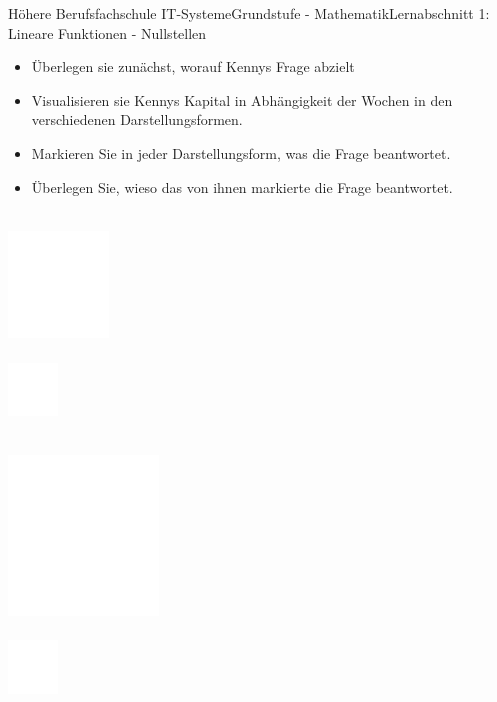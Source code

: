 \documentclass[oneside,openany,headings=optiontotoc,11pt,numbers=noenddot]{scrreprt}
\begin{document}
\begin{worksheet}{Höhere Berufsfachschule IT-Systeme}{Grundstufe - Mathematik}{Lernabschnitt 1: Lineare Funktionen - Nullstellen}
\begin{framed}
\begin{itemize}
				\item Überlegen sie zunächst, worauf Kennys Frage abzielt
				\item Visualisieren sie Kennys Kapital in Abhängigkeit der Wochen in den verschiedenen Darstellungsformen.
				\item Markieren Sie in jeder Darstellungsform, was die Frage beantwortet.
				\item Überlegen Sie, wieso das von ihnen markierte die Frage beantwortet.
			\end{itemize}
			\par\noindent
		\end{framed}
		\newpage
		\begin{framed}
			\noindent
			\small{\color{codegray}{Sprache}}\\
			\includegraphics[width=0.2\textwidth]{../../empty.jpg}\\
			\color{codegray}{Wieso erkennt man an der vorgenommenen Markierung, was bestimmt werden muss?}\\
			\includegraphics[width=0.1\textwidth]{../../empty.jpg}\\
		\end{framed}
		\begin{framed}
			\noindent
			\small{\color{codegray}{Funktion}}\\
			\includegraphics[width=0.3\textwidth]{../../empty.jpg}\\
			\color{codegray}{Was haben Sie gemacht? Wieso führt dieses Vorgehen zur Lösung?}\\
			\includegraphics[width=0.1\textwidth]{../../empty.jpg}\\

\end{framed}
\end{worksheet}
\end{document}
